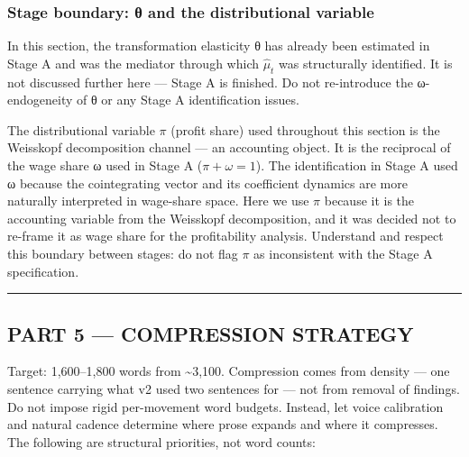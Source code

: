\subsubsection{Stage boundary: θ and the distributional
variable}\label{stage-boundary-ux3b8-and-the-distributional-variable}

In this section, the transformation elasticity θ has already been
estimated in Stage A and was the mediator through which \(\hat{\mu}_t\)
was structurally identified. It is not discussed further here --- Stage
A is finished. Do not re-introduce the ω-endogeneity of θ or any Stage A
identification issues.

The distributional variable \(\pi\) (profit share) used throughout this
section is the Weisskopf decomposition channel --- an accounting object.
It is the reciprocal of the wage share ω used in Stage A
(\(\pi + \omega = 1\)). The identification in Stage A used ω because the
cointegrating vector and its coefficient dynamics are more naturally
interpreted in wage-share space. Here we use \(\pi\) because it is the
accounting variable from the Weisskopf decomposition, and it was decided
not to re-frame it as wage share for the profitability analysis.
Understand and respect this boundary between stages: do not flag \(\pi\)
as inconsistent with the Stage A specification.

\begin{center}\rule{0.5\linewidth}{0.5pt}\end{center}

\subsection{PART 5 --- COMPRESSION
STRATEGY}\label{part-5--compression-strategy}

Target: 1,600--1,800 words from \textasciitilde3,100. Compression comes
from density --- one sentence carrying what v2 used two sentences for
--- not from removal of findings. Do not impose rigid per-movement word
budgets. Instead, let voice calibration and natural cadence determine
where prose expands and where it compresses. The following are
structural priorities, not word counts:

